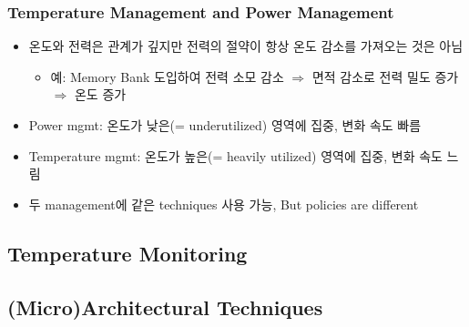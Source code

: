 \subsubsection*{Temperature Management and Power Management}
\begin{itemize}
    \item 온도와 전력은 관계가 깊지만 전력의 절약이 항상 온도 감소를 가져오는 것은 아님
    \begin{itemize}
        \item 예: Memory Bank 도입하여 전력 소모 감소 $\Rightarrow$ 면적 감소로 전력 밀도 증가 $\Rightarrow$ 온도 증가
    \end{itemize}
    \item Power mgmt: 온도가 낮은(= underutilized) 영역에 집중, 변화 속도 빠름
    \item Temperature mgmt: 온도가 높은(= heavily utilized) 영역에 집중, 변화 속도 느림
    \item 두 management에 같은 techniques 사용 가능, But policies are different
\end{itemize}

\subsection{Temperature Monitoring}

\subsection{(Micro)Architectural Techniques}
